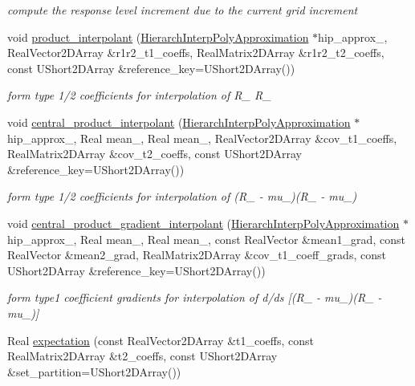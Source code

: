 \begin{DoxyCompactItemize}
\begin{DoxyCompactList}\small\item\em compute the response level increment due to the current grid increment \end{DoxyCompactList}\item 
void \hyperlink{classPecos_1_1HierarchInterpPolyApproximation_a56d259d2bc9e4b3c7177953e103ed70d}{product\+\_\+interpolant} (\hyperlink{classPecos_1_1HierarchInterpPolyApproximation}{Hierarch\+Interp\+Poly\+Approximation} $\ast$hip\+\_\+approx\+\_, Real\+Vector2\+D\+Array \&r1r2\+\_\+t1\+\_\+coeffs, Real\+Matrix2\+D\+Array \&r1r2\+\_\+t2\+\_\+coeffs, const U\+Short2\+D\+Array \&reference\+\_\+key=U\+Short2\+D\+Array())
\begin{DoxyCompactList}\small\item\em form type 1/2 coefficients for interpolation of R\+\_ R\+\_ \end{DoxyCompactList}\item 
void \hyperlink{classPecos_1_1HierarchInterpPolyApproximation_ad568c5307549ce96de86b1cd5fa0097d}{central\+\_\+product\+\_\+interpolant} (\hyperlink{classPecos_1_1HierarchInterpPolyApproximation}{Hierarch\+Interp\+Poly\+Approximation} $\ast$hip\+\_\+approx\+\_, Real mean\+\_, Real mean\+\_, Real\+Vector2\+D\+Array \&cov\+\_\+t1\+\_\+coeffs, Real\+Matrix2\+D\+Array \&cov\+\_\+t2\+\_\+coeffs, const U\+Short2\+D\+Array \&reference\+\_\+key=U\+Short2\+D\+Array())
\begin{DoxyCompactList}\small\item\em form type 1/2 coefficients for interpolation of (R\+\_ -\/ mu\+\_)(R\+\_ -\/ mu\+\_) \end{DoxyCompactList}\item 
void \hyperlink{classPecos_1_1HierarchInterpPolyApproximation_a0877cb2c939711ebe697928c6649affc}{central\+\_\+product\+\_\+gradient\+\_\+interpolant} (\hyperlink{classPecos_1_1HierarchInterpPolyApproximation}{Hierarch\+Interp\+Poly\+Approximation} $\ast$hip\+\_\+approx\+\_, Real mean\+\_, Real mean\+\_, const Real\+Vector \&mean1\+\_\+grad, const Real\+Vector \&mean2\+\_\+grad, Real\+Matrix2\+D\+Array \&cov\+\_\+t1\+\_\+coeff\+\_\+grads, const U\+Short2\+D\+Array \&reference\+\_\+key=U\+Short2\+D\+Array())\label{classPecos_1_1HierarchInterpPolyApproximation_a0877cb2c939711ebe697928c6649affc}

\begin{DoxyCompactList}\small\item\em form type1 coefficient gradients for interpolation of d/ds \mbox{[}(R\+\_ -\/ mu\+\_)(R\+\_ -\/ mu\+\_)\mbox{]} \end{DoxyCompactList}\item 
Real \hyperlink{classPecos_1_1HierarchInterpPolyApproximation_af379a9ca4f3a57b0288206ca8bf4d726}{expectation} (const Real\+Vector2\+D\+Array \&t1\+\_\+coeffs, const Real\+Matrix2\+D\+Array \&t2\+\_\+coeffs, const U\+Short2\+D\+Array \&set\+\_\+partition=U\+Short2\+D\+Array())\label{classPecos_1_1HierarchInterpPolyApproximation_af379a9ca4f3a57b0288206ca8bf4d726}


\end{DoxyCompactItemize}
